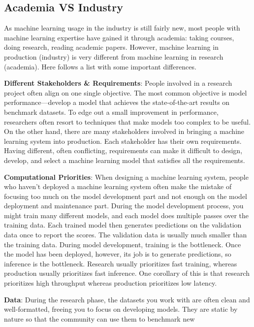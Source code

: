 \subsection{Academia VS Industry}

As machine learning usage in the industry is still fairly new, most people with machine learning expertise have gained
it through academia: taking courses, doing research, reading academic papers. However, machine learning in production
(industry) is very different from machine learning in research (academia). Here follows a list with some important
differences.
\bit
\item \textbf{Different Stakeholders \& Requirements}: People involved in a research project often align on one single
objective. The most common objective is model performance—develop a model that achieves the state-of-the-art results on
benchmark datasets. To edge out a small improvement in performance, researchers often resort to techniques that make
models too complex to be useful. On the other hand, there are many stakeholders involved in bringing a machine learning
system into production. Each stakeholder has their own requirements. Having different, often conflicting, requirements
can make it difficult to design, develop, and select a machine learning model that satisfies all the requirements.
\item \textbf{Computational Priorities}: When designing a machine learning system, people who haven't deployed a machine
learning system often make the mistake of focusing too much on the model development part and not enough on the model
deployment and maintenance part. During the model development process, you might train many different models, and each
model does multiple passes over the training data. Each trained model then generates predictions on the validation data
once to report the scores. The validation data is usually much smaller than the training data. During model development,
training is the bottleneck. Once the model has been deployed, however, its job is to generate predictions, so inference
is the bottleneck. Research usually prioritizes fast training, whereas production usually prioritizes fast inference.
One corollary of this is that research prioritizes high throughput whereas production prioritizes low latency.
\item \textbf{Data}: During the research phase, the datasets you work with are often clean and well-formatted, freeing
you to focus on developing models. They are static by nature so that the community can use them to benchmark new
